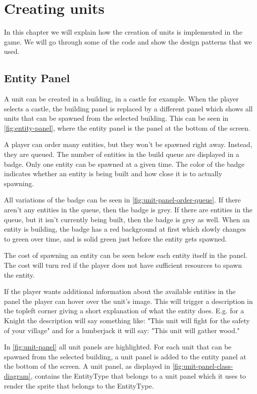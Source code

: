 \section{Creating units} 
In this chapter we will explain how the creation of units is implemented in 
the game. We will go through some of the code and show the design patterns 
that we used.

\subsection{Entity Panel} 
\label{sec:EntityPanel} 
A unit can be created in a building, in a castle for example. When the player 
selects a castle, the building panel is replaced by a different panel which 
shows all units that can be spawned from the selected building. This can be 
seen in \cref{fig:entity-panel}, where the entity panel is the panel at the 
bottom of the screen. 

A player can order many entities, but they won't be spawned right away.
Instead, they are queued. The number of entities in the build queue are
displayed in a badge. Only one entity can be spawned at a given time. The color
of the badge indicates whether an entity is being built and how close it is to
actually spawning. 

All variations of the badge can be seen in \cref{fig:unit-panel-order-queue}.
If there aren't any entities in the queue, then the badge is grey. If there are
entities in the queue, but it isn't currently being built, then the badge is
grey as well. When an entity is building, the badge has a red background at
first which slowly changes to green over time, and is solid green just before
the entity gets spawned.

The cost of spawning an entity can be seen below each entity itself in the
panel. The cost will turn red if the player does not have sufficient resources
to spawn the entity. 

If the player wants additional information about the available
entities in the panel the player can hover over the unit's image. This will
trigger a description in the topleft corner giving a short explanation of what
the entity does. E.g. for a Knight the description will say something like:
"This unit will fight for the safety of your village" and for a lumberjack it
will say: "This unit will gather wood."

In \cref{fig:unit-panel} all unit panels are highlighted. For each unit that
can be spawned from the selected building, a unit panel is added to the entity
panel at the bottom of the screen. A unit panel, as displayed in
\cref{fig:unit-panel-class-diagram}, contains the EntityType that belongs to a
unit panel which it uses to render the sprite that belongs to the EntityType.

